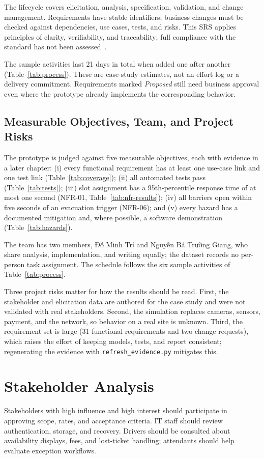 The lifecycle covers elicitation, analysis, specification, validation, and change management. Requirements have stable identifiers; business changes must be checked against dependencies, use cases, tests, and risks. This SRS applies principles of clarity, verifiability, and traceability; full compliance with the standard has not been assessed~\cite{iso29148}.

The sample activities last 21 days in total when added one after another (Table~\ref{tab:process}). These are case-study estimates, not an effort log or a delivery commitment. Requirements marked \emph{Proposed} still need business approval even where the prototype already implements the corresponding behavior.

\subsection{Measurable Objectives, Team, and Project Risks}
The prototype is judged against five measurable objectives, each with evidence in a later chapter: (i) every functional requirement has at least one use-case link and one test link (Table~\ref{tab:coverage}); (ii) all automated tests pass (Table~\ref{tab:tests}); (iii) slot assignment has a 95th-percentile response time of at most one second (NFR-01, Table~\ref{tab:nfr-results}); (iv) all barriers open within five seconds of an evacuation trigger (NFR-06); and (v) every hazard has a documented mitigation and, where possible, a software demonstration (Table~\ref{tab:hazards}).

The team has two members, Đỗ Minh Trí and Nguyễn Bá Trường Giang, who share analysis, implementation, and writing equally; the dataset records no per-person task assignment. The schedule follows the six sample activities of Table~\ref{tab:process}.

Three project risks matter for how the results should be read. First, the stakeholder and elicitation data are authored for the case study and were not validated with real stakeholders. Second, the simulation replaces cameras, sensors, payment, and the network, so behavior on a real site is unknown. Third, the requirement set is large (31 functional requirements and two change requests), which raises the effort of keeping models, tests, and report consistent; regenerating the evidence with \texttt{refresh\_evidence.py} mitigates this.

\section{Stakeholder Analysis}


Stakeholders with high influence and high interest should participate in approving scope, rates, and acceptance criteria. IT staff should review authentication, storage, and recovery. Drivers should be consulted about availability displays, fees, and lost-ticket handling; attendants should help evaluate exception workflows.

